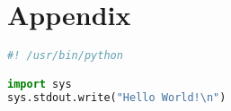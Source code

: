 \documentclass{article}
\begin{document}
\section*{Appendix}

\begin{file}[hello.py]
\begin{lstlisting}[language=Python]
#! /usr/bin/python

import sys
sys.stdout.write("Hello World!\n")
\end{lstlisting}
\end{file}
\end{document}
